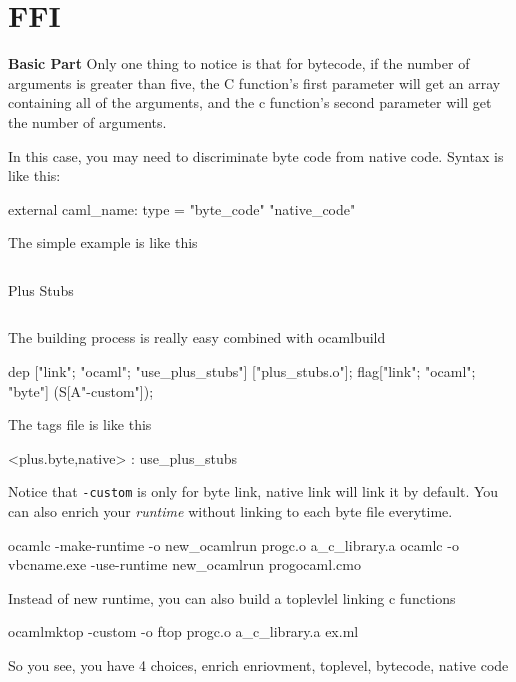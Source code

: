 \section{FFI}

\textbf{Basic Part} Only one thing to notice is that for bytecode, if
the number of arguments is greater than five, the C function's first
parameter will get an array containing all of the arguments, and the c
function's second parameter will get the number of arguments.

In this case, you may need to discriminate byte code from native
code. Syntax is like this:
\begin{ocamlcode}
external caml_name: type = "byte_code" "native_code"  
\end{ocamlcode}

The simple example is like this

\begin{listing}
  \inputminted[fontsize=\scriptsize,firstline=24,lastline=42]{c}{code/ffi/simple/plus_stubs.c}
  \caption{Plus Stubs}
  \label{lst:plus_stubs}
\end{listing}

\inputminted[fontsize=\scriptsize]{ocaml}{code/ffi/simple/plus.ml}

The building process is really easy combined with ocamlbuild

\begin{ocamlcode}
    dep ["link"; "ocaml"; "use_plus_stubs"] ["plus_stubs.o"];
    flag["link"; "ocaml"; "byte"] (S[A"-custom"]);
\end{ocamlcode}

The tags file is like this
\begin{bluetext}
<plus.{byte,native}> : use_plus_stubs  
\end{bluetext}
Notice that \verb|-custom| is only for byte link, native link will
link it by default. You can also enrich your \textit{runtime} without linking
to each byte file everytime.
\begin{bashcode}
  ocamlc -make-runtime -o new_ocamlrun progc.o a_c_library.a
  ocamlc -o vbcname.exe -use-runtime new_ocamlrun progocaml.cmo
\end{bashcode}
Instead of new runtime, you can also build a toplevlel linking c
functions
\begin{bashcode}
  ocamlmktop -custom -o ftop progc.o a_c_library.a ex.ml
\end{bashcode}

So you see, you have 4 choices, enrich enriovment, toplevel, bytecode,
native code

